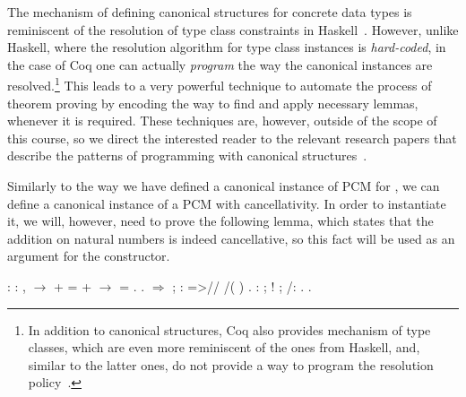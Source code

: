 The mechanism of defining canonical structures for concrete data types
is reminiscent of the resolution of type class constraints in
Haskell~\cite{Wadler-Blott:POPL89}. However, unlike Haskell, where
the resolution algorithm for type class instances is \textit{hard-coded}, in
the case of Coq one can actually \textit{program} the way the canonical
instances are resolved.\footnote{In addition to canonical structures,
Coq also provides mechanism of type classes, which are even more
reminiscent of the ones from Haskell, and, similar to the latter
ones, do not provide a way to program the resolution
policy~\cite{Sozeau-Oury:TPHOL08}.} This leads to a very powerful
technique to automate the process of theorem proving by encoding the
way to find and apply necessary lemmas, whenever it is required. These
techniques are, however, outside of the scope of this course, so we
direct the interested reader to the relevant research papers that
describe the patterns of programming with canonical
structures~\cite{Gontier-al:ICFP11,Mahboubi-Tassi:ITP13,Garillot:PhD}.


Similarly to the way we have defined a canonical instance of PCM for
, we can define a canonical instance of a PCM with
cancellativity. In order to instantiate it, we will, however, need to
prove the following lemma, which states that the addition on natural
numbers is indeed cancellative, so this fact will be used as an
argument for the  constructor.


\begin{coqdoccode}
\coqdocemptyline
\coqdocnoindent
{}  : \coqdockw{\ensuremath{\forall}}   : ,  \ensuremath{\rightarrow}  +  =  +  \ensuremath{\rightarrow}  = .\coqdoceol
\coqdocnoindent
{}.\coqdoceol
\coqdocnoindent
{}\ensuremath{\Rightarrow}   ; : =>//  /(\coqdocvar{\_} )  \coqdocvar{\_} .\coqdoceol
\coqdocnoindent
{} : ;  !  ; /: .\coqdoceol
\coqdocnoindent
{}.\coqdoceol
\coqdocemptyline
\end{coqdoccode}


